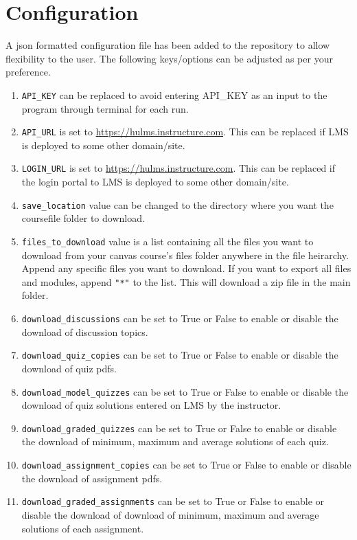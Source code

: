 \documentclass{article}
\begin{document}
\section{Configuration}
A json formatted configuration file has been added to the repository to allow flexibility to the user. The following keys/options can be adjusted as per your preference.
\begin{enumerate}
\item \texttt{API\_KEY} can be replaced to avoid entering API\_KEY as an input to the program through terminal for each run.
\item \texttt{API\_URL} is set to \url{https://hulms.instructure.com}. This can be replaced if LMS is deployed to some other domain/site.
\item \texttt{LOGIN\_URL} is set to \url{https://hulms.instructure.com}. This can be replaced if the login portal to LMS is deployed to some other domain/site.
\item \texttt{save\_location} value can be changed to the directory where you want the coursefile folder to download.
\item \texttt{files\_to\_download} value is a list containing all the files you want to download from your canvas course's files folder anywhere in the file heirarchy. Append any specific files you want to download. If you want to export all files and modules, append \texttt{"*"} to the list. This will download a zip file in the main folder.
\item \texttt{download\_discussions} can be set to  True or False to enable or disable the download of discussion topics.
\item \texttt{download\_quiz\_copies} can be set to  True or False to enable or disable the download of quiz pdfs.
\item \texttt{download\_model\_quizzes} can be set to  True or False to enable or disable the download of quiz solutions entered on LMS by the instructor.
\item \texttt{download\_graded\_quizzes} can be set to  True or False to enable or disable the download of minimum, maximum and average solutions of each quiz.
\item \texttt{download\_assignment\_copies} can be set to  True or False to enable or disable the download of assignment pdfs.
\item \texttt{download\_graded\_assignments} can be set to  True or False to enable or disable the download of download of minimum, maximum and average solutions of each assignment.
\end{enumerate}
\end{document}
